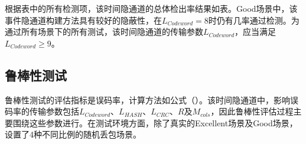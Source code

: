 根据表中的所有检测项，该时间隐通道的总体检出率结果如表。Good场景中，该事件隐通道构建方法具有较好的隐蔽性，在$L_{Codeword}=8$时仍有几率通过检测。为通过所有场景下的所有测试，该时间隐通道的传输参数$L_{Codeword}$，应当满足$L_{Codeword}\ge 9$。

\subsection{鲁棒性测试}
\label{chap:hash:result:robustness}

鲁棒性测试的评估指标是误码率，计算方法如公式（）。该时间隐通道中，影响误码率的传输参数包括$L_{Codeword}$、$L_{HASH}$、$L_{CRC}$、$R$及$M_{cols}$，因此鲁棒性评估过程主要围绕这些参数进行。在测试环境方面，除了真实的Excellent场景及Good场景，设置了4种不同比例的随机丢包场景。

